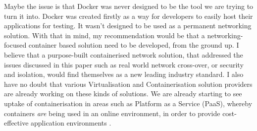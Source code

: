 Maybe the issue is that Docker was never designed to be the tool we are trying to turn it into. Docker was created firstly as a way for developers to easily host their applications for testing. It wasn't designed to be used as a permanent networking solution. With that in mind, my recommendation would be that a networking-focused container based solution need to be developed, from the ground up. I believe that a purpose-built containerised network solution, that addressed the issues discussed in this paper such as real world network cross-over, or security and isolation, would find themselves as a new leading industry standard. I also have no doubt that various Virtualisation and Containerisation solution providers are already working on these kinds of solutions. We are already starting to see uptake of containerisation in areas such as Platform as a Service (PaaS), whereby containers \emph{are} being used in an online environment, in order to provide cost-effective application environments \citep[Page 55]{PAASCloudBook}. %
